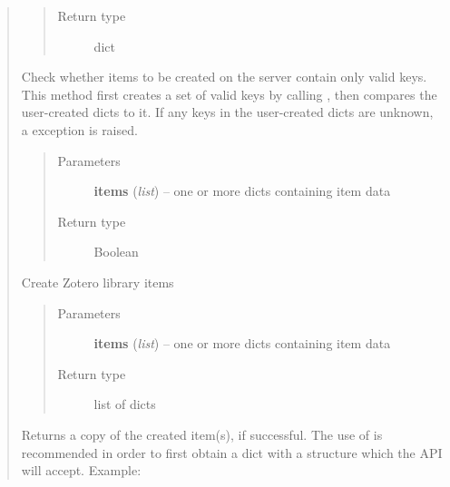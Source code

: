 \documentclass[letterpaper,10pt,english]{sphinxmanual}
\begin{document}
\begin{quote}
\begin{fulllineitems}
\begin{quote}
\begin{description}
\item[{Return type}] \leavevmode
dict

\end{description}\end{quote}

\end{fulllineitems}


\begin{fulllineitems}
\label{index:pyzotero.zotero.Zotero.check_items}
Check whether items to be created on the server contain only valid keys. This method first creates a set of valid keys by calling {\hyperref[index:pyzotero.zotero.Zotero.item_fields]{}}, then compares the user-created dicts to it. If any keys in the user-created dicts are unknown, a  exception is raised.
\begin{quote}\begin{description}
\item[{Parameters}] \leavevmode
\textbf{items} (\emph{list}) -- one or more dicts containing item data

\item[{Return type}] \leavevmode
Boolean

\end{description}\end{quote}

\end{fulllineitems}


\begin{fulllineitems}
\label{index:pyzotero.zotero.Zotero.create_items}
Create Zotero library items
\begin{quote}\begin{description}
\item[{Parameters}] \leavevmode
\textbf{items} (\emph{list}) -- one or more dicts containing item data

\item[{Return type}] \leavevmode
list of dicts

\end{description}\end{quote}

Returns a copy of the created item(s), if successful. The use of {\hyperref[index:pyzotero.zotero.Zotero.item_template]{}} is recommended in order to first obtain a dict with a structure which the API will accept.
Example:


\end{fulllineitems}
\end{quote}
\end{document}
